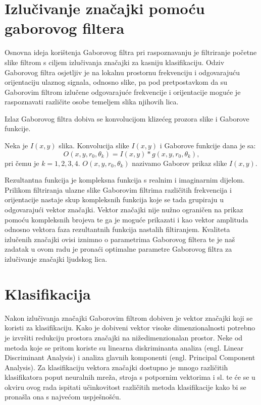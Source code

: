 \documentclass{article}
\begin{document}
\newpage
\section{Izlučivanje značajki pomoću gaborovog filtera}
Osnovna ideja korištenja Gaborovog filtra pri raspoznavanju je filtriranje početne 
slike filtrom s ciljem izlučivanja značajki za kasniju klasifikaciju.
Odziv Gaborovog filtra osjetljiv je na lokalnu prostornu frekvenciju i odgovarajuću orijentaciju
ulaznog signala, odnosno slike, pa pod pretpostavkom da su Gaborovim filtrom izlučene
odgovarajuće frekvencije i orijentacije moguće je raspoznavati različite osobe
temeljem slika njihovih lica.

Izlaz Gaborovog filtra dobiva se konvolucijom klizećeg prozora slike i Gaborove
funkcije.

Neka je $I(x,y)$ slika. Konvolucija slike $I(x,y)$ i Gaborove funkcije dana je
sa:
\begin{equation}
O(x,y,r_0, \theta_k) = I(x,y) * g(x,y,r_0, \theta_k),
\label{konvolucija-filter-slika}
\end{equation}
pri čemu je $k = 1, 2, 3, 4$. $O(x,y,r_0, \theta_k)$ nazivamo Gaborov prikaz
slike $I(x,y)$.

Rezultantna funkcija je kompleksna funkcija s realnim i imaginarnim dijelom. Prilikom 
filtriranja ulazne slike Gaborovim filtrima različitih frekvencija i orijentacije nastaje
skup kompleksnih funkcija koje se tada grupiraju u odgovarajući vektor značajki.
Vektor značajki nije nužno ograničen na prikaz pomoću kompleksnih brojeva te ga je moguće
prikazati i kao vektor amplituda odnosno vektora faza rezultantnih funkcija nastalih filtiranjem.
Kvaliteta izlučenih značajki ovisi iznimno o parametrima Gaborovog filtera te je 
naš zadatak u ovom radu je pronaći optimalne parametre Gaborovog filtra za izlučivanje
značajki ljudskog lica.

\newpage
\section{Klasifikacija}

Nakon izlučivanja značajki Gaborovim filtrom dobiven je vektor značajki koji se koristi za klasifikaciju. 
Kako je dobiveni vektor visoke dimenzionalnosti potrebno je izvršiti redukciju prostora značajki na nižedimenzionalan prostor.
Neke od metoda koje se pritom koriste su linearna diskriminanta analiza (engl. Linear Discriminant Analysis) i analiza glavnih komponenti
(engl. Principal Component Analysis). 
Za klasifikaciju vektora značajki dostupno je mnogo različitih klasifikatora poput neuralnih mreža, stroja s potpornim vektorima i sl.
te će se u okviru ovog rada ispitati učinkovitost različitih metoda klasifikacije kako bi se pronašla ona s najvećom uspješnošću.
\end{document}
